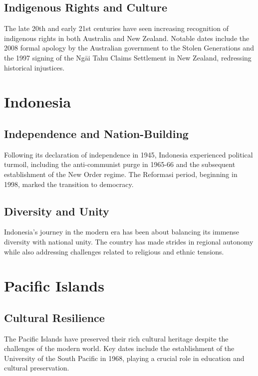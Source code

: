 \documentclass{book}
\begin{document}
\subsection{Indigenous Rights and Culture}
\label{subsec:indigenous-rights-culture}
The late 20th and early 21st centuries have seen increasing recognition of indigenous rights in both Australia and New Zealand. Notable dates include the 2008 formal apology by the Australian government to the Stolen Generations and the 1997 signing of the Ngāi Tahu Claims Settlement in New Zealand, redressing historical injustices.

\section{Indonesia}
\label{sec:indonesia}

\subsection{Independence and Nation-Building}
\label{subsec:independence-nation-building}
Following its declaration of independence in 1945, Indonesia experienced political turmoil, including the anti-communist purge in 1965-66 and the subsequent establishment of the New Order regime. The Reformasi period, beginning in 1998, marked the transition to democracy.

\subsection{Diversity and Unity}
\label{subsec:diversity-unity}
Indonesia’s journey in the modern era has been about balancing its immense diversity with national unity. The country has made strides in regional autonomy while also addressing challenges related to religious and ethnic tensions.

\section{Pacific Islands}
\label{sec:pacific-islands}

\subsection{Cultural Resilience}
\label{subsec:cultural-resilience}
The Pacific Islands have preserved their rich cultural heritage despite the challenges of the modern world. Key dates include the establishment of the University of the South Pacific in 1968, playing a crucial role in education and cultural preservation.
\end{document}
